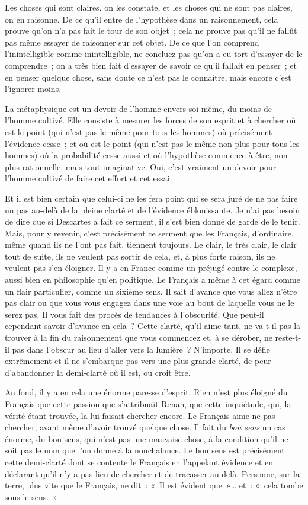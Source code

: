 \documentclass[french,twoside]{book} %
\begin{document}
Les choses qui sont claires, on les constate, et les choses qui ne sont pas claires, on en raisonne. De ce qu’il entre de l’hypothèse dans un raisonnement, cela prouve qu’on n’a pas fait le tour de son objet ; cela ne prouve pas qu’il ne fallût pas même essayer de raisonner sur cet objet. De ce que l’on comprend l’inintelligible comme inintelligible, ne concluez pas qu’on a eu tort d’essayer de le comprendre ; on a très bien fait d’essayer de savoir ce qu’il fallait en penser ; et en penser quelque chose,  sans doute ce n’est pas le connaître, mais encore c’est l’ignorer moins.\par
La métaphysique est un devoir de l’homme envers soi-même, du moins de l’homme cultivé. Elle consiste à mesurer les forces de son esprit et à chercher où est le point (qui n’est pas le même pour tous les hommes) où précisément l’évidence cesse ; et où est le point (qui n’est pas le même non plus pour tous les hommes) où la probabilité cesse aussi et où l’hypothèse commence à être, non plus rationnelle, mais tout imaginative. Oui, c’est vraiment un devoir pour l’homme cultivé de faire cet effort et cet essai.\par
Et il est bien certain que celui-ci ne les fera point qui se sera juré de ne pas faire un pas au-delà de la pleine clarté et de l’évidence éblouissante. Je n’ai pas besoin de dire que si Descartes a fait ce serment, il s’est bien donné de garde de le tenir. Mais, pour y revenir, c’est précisément ce serment que les Français, d’ordinaire, même quand ils ne l’ont pas fait, tiennent toujours. Le clair, le très clair, le clair tout de suite, ils ne veulent pas sortir de cela, et, à plus forte raison, ils ne veulent pas s’en éloigner. Il y a en France comme un préjugé contre le complexe, aussi bien en philosophie qu’en politique. Le Français a même à cet égard comme un flair particulier, comme un  sixième sens. Il sait d’avance que vous allez n’être pas clair ou que vous vous engagez dans une voie au bout de laquelle vous ne le serez pas. Il vous fait des procès de tendances à l’obscurité. Que peut-il cependant savoir d’avance en cela ? Cette clarté, qu’il aime tant, ne va-t-il pas la trouver à la fin du raisonnement que vous commencez et, à se dérober, ne reste-t-il pas dans l’obscur au lieu d’aller vers la lumière ? N’importe. Il se défie extrêmement et il ne s’embarque pas vers une plus grande clarté, de peur d’abandonner la demi-clarté où il est, ou croit être.\par
Au fond, il y a en cela une énorme paresse d’esprit. Rien n’est plus éloigné du Français que cette passion que s’attribuait Renan, que cette inquiétude, qui, la vérité étant trouvée, la lui faisait chercher encore. Le Français aime ne pas chercher, avant même d’avoir trouvé quelque chose. Il fait du {\itshape bon sens} un cas énorme, du bon sens, qui n’est pas une mauvaise chose, à la condition qu’il ne soit pas le nom que l’on donne à la nonchalance. Le bon sens est précisément cette demi-clarté dont se contente le Français en l’appelant évidence et en déclarant qu’il n’y a pas lieu de chercher et de tracasser au-delà. Personne, sur la terre, plus vite que le Français, ne dit : « Il est évident que »… et : « cela tombe sous le sens. »\par
\end{document}
